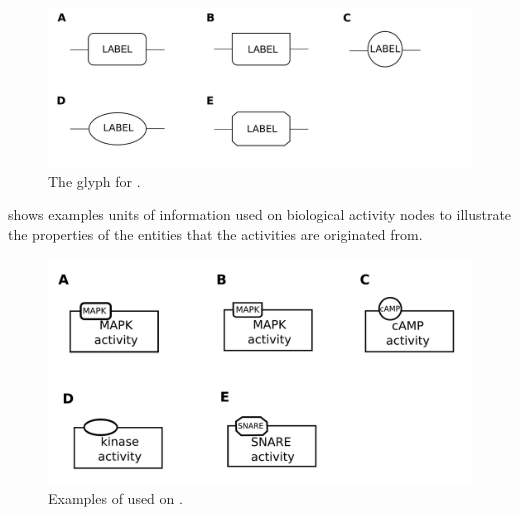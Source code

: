 \begin{figure}[H]
  \centering
  \includegraphics[scale = 0.2]{images/unitInformation}
  \caption{The \AF glyph for .}
  \label{fig:af:unitInfo}
\end{figure}

 shows examples units of information used on biological activity nodes to illustrate the properties of the entities that the activities are originated from.

\begin{figure}[H]
  \centering
  \includegraphics[scale = 0.5]{examples/unitofinformation}
  \caption{Examples of  used on .}
  \label{fig:af:unitofinfo}
\end{figure}

